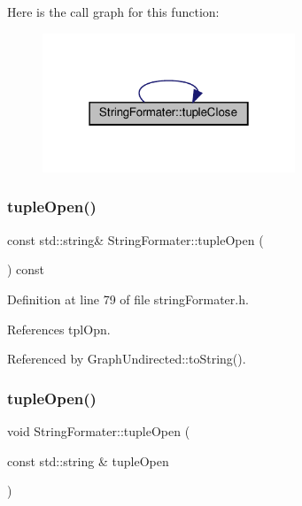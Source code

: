 Here is the call graph for this function\+:
\nopagebreak
\begin{figure}[H]
\begin{center}
\leavevmode
\includegraphics[width=214pt]{classStringFormater_ad0760f314079f6af19d09f45a0b77642_cgraph}
\end{center}
\end{figure}
\mbox{\label{classStringFormater_a723672ca8ad990eebc181b051199f4e8}} 
\subsubsection{\texorpdfstring{tuple\+Open()}{tupleOpen()}\hspace{0.1cm}{\footnotesize\ttfamily [1/2]}}
{\footnotesize\ttfamily const std\+::string\& String\+Formater\+::tuple\+Open (\begin{DoxyParamCaption}{ }\end{DoxyParamCaption}) const\hspace{0.3cm}{\ttfamily [inline]}}



Definition at line 79 of file string\+Formater.\+h.



References tpl\+Opn.



Referenced by Graph\+Undirected\+::to\+String().

\mbox{\label{classStringFormater_ac9d4c3bfaa5baaf7dc97768a9068128a}} 
\subsubsection{\texorpdfstring{tuple\+Open()}{tupleOpen()}\hspace{0.1cm}{\footnotesize\ttfamily [2/2]}}
{\footnotesize\ttfamily void String\+Formater\+::tuple\+Open (\begin{DoxyParamCaption}\item[{const std\+::string \&}]{tuple\+Open }\end{DoxyParamCaption})\hspace{0.3cm}{\ttfamily [inline]}}



